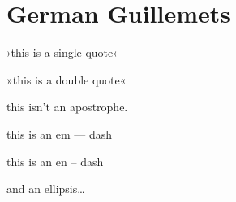 
\def\mytitle{MultiMarkdown German Guillemets Test}

\part{German Guillemets}
\label{germanguillemets}

›this is a single quote‹

»this is a double quote«

this isn't an apostrophe.

this is an em --- dash

this is an en -- dash

and an ellipsis{\ldots}




